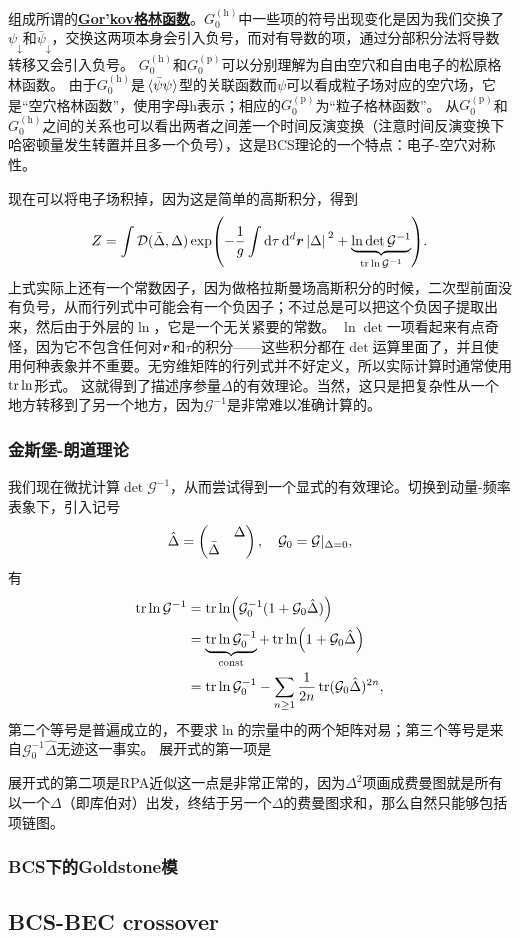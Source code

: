 \documentclass[hyperref, UTF8, a4paper]{ctexart}
\newcommand*{\const}{\mathrm{const}}
\newcommand*{\fd}[1]{\mathcal{D}{#1}}
\newcommand{\concept}[1]{\underline{\textbf{#1}}}
\begin{document}
组成所谓的\concept{Gor'kov格林函数}。$G_0^{(\text{h})}$中一些项的符号出现变化是因为我们交换了$\psi_\downarrow$和$\bar{\psi}_\downarrow$，交换这两项本身会引入负号，而对有导数的项，通过分部积分法将导数转移又会引入负号。
$G_0^{(\text{h})}$和$G_0^{(\text{p})}$可以分别理解为自由空穴和自由电子的松原格林函数。
由于$G_0^{(\text{h})}$是$\expval*{\bar{\psi} \psi}$型的关联函数而$\psi$可以看成粒子场对应的空穴场，它是“空穴格林函数”，使用字母h表示；相应的$G_0^{(\text{p})}$为“粒子格林函数”。
从$G_0^{(\text{p})}$和$G_0^{(\text{h})}$之间的关系也可以看出两者之间差一个时间反演变换（注意时间反演变换下哈密顿量发生转置并且多一个负号），这是BCS理论的一个特点：电子-空穴对称性。

现在可以将电子场积掉，因为这是简单的高斯积分，得到
\begin{equation}
    Z = \int \fd(\bar{\Delta}, \Delta) \exp(- \frac{1}{g} \int \dd{\tau} \dd[d]{\vb*{r}} \abs*{\Delta}^2 + \underbrace{\ln \det \mathcal{G}^{-1}}_{\trace \ln \mathcal{G}^{-1}}).
\end{equation}
上式实际上还有一个常数因子，因为做格拉斯曼场高斯积分的时候，二次型前面没有负号，从而行列式中可能会有一个负因子；不过总是可以把这个负因子提取出来，然后由于外层的$\ln$，它是一个无关紧要的常数。
$\ln \det$一项看起来有点奇怪，因为它不包含任何对$\vb*{r}$和$\tau$的积分——这些积分都在$\det$运算里面了，并且使用何种表象并不重要。无穷维矩阵的行列式并不好定义，所以实际计算时通常使用$\trace \ln$形式。
这就得到了描述序参量$\Delta$的有效理论。当然，这只是把复杂性从一个地方转移到了另一个地方，因为$\mathcal{G}^{-1}$是非常难以准确计算的。

\subsubsection{金斯堡-朗道理论}

我们现在微扰计算$\det \mathcal{G}^{-1}$，从而尝试得到一个显式的有效理论。切换到动量-频率表象下，引入记号
\[
    \hat{\Delta} = \pmqty{ & \Delta \\ \bar{\Delta} & }, \quad \mathcal{G}_0 = \mathcal{G} |_{\Delta = 0},
\]
有
\[
    \begin{aligned}
        \trace \ln \mathcal{G}^{-1} &= \trace \ln (\mathcal{G}^{-1}_0 (1 + \mathcal{G}_0 \hat{\Delta})) \\
        &= \underbrace{\trace \ln \mathcal{G}^{-1}_0}_{\const} + \trace \ln (1 + \mathcal{G}_0 \hat{\Delta}) \\
        &= \trace \ln \mathcal{G}^{-1}_0 - \sum_{n \geq 1} \frac{1}{2n} \trace (\mathcal{G}_0 \hat{\Delta})^{2n} ,
    \end{aligned}
\]
第二个等号是普遍成立的，不要求$\ln$的宗量中的两个矩阵对易；第三个等号是来自$\mathcal{G}^{-1}_0 \hat{\Delta}$无迹这一事实。
展开式的第一项是

展开式的第二项是RPA近似这一点是非常正常的，因为$\Delta^2$项画成费曼图就是所有以一个$\Delta$（即库伯对）出发，终结于另一个$\Delta$的费曼图求和，那么自然只能够包括项链图。

\subsubsection{BCS下的Goldstone模}

\subsection{BCS-BEC crossover}
\end{document}
